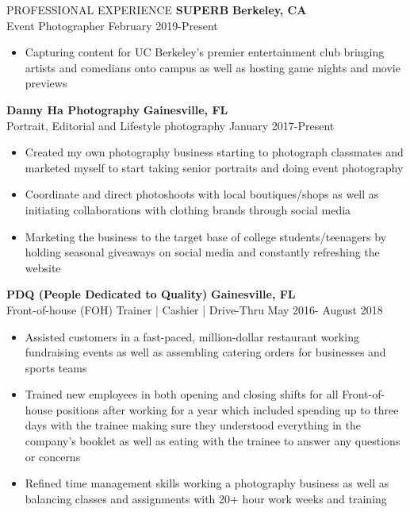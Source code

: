 \documentclass{resume}
\begin{document}
\begin{rSection}{PROFESSIONAL EXPERIENCE}
{\bf SUPERB } \hfill {\bf Berkeley, CA}
\\ {Event Photographer}  \hfill {February 2019-Present}
\begin{itemize}
  \item Capturing content for UC Berkeley’s premier entertainment club bringing artists and comedians onto campus as well as hosting game nights and movie previews
\end{itemize}

{\bf Danny Ha Photography } \hfill {\bf Gainesville, FL}
\\ {Portrait, Editorial and Lifestyle photography  	}  \hfill {January 2017-Present}
\begin{itemize}
  \item Created my own photography business starting to photograph classmates and marketed myself to start taking senior portraits and doing event photography
  \item Coordinate and direct photoshoots with local boutiques/shops as well as initiating collaborations with clothing brands through social media 
  \item Marketing the business to the target base of college students/teenagers by holding seasonal giveaways on social media and constantly refreshing the website
\end{itemize}

{\bf PDQ (People Dedicated to Quality)  } \hfill {\bf Gainesville, FL}
\\ {Front-of-house (FOH) Trainer | Cashier | Drive-Thru	}  \hfill {May 2016- August 2018}
\begin{itemize}
  \item Assisted customers in a fast-paced, million-dollar restaurant working fundraising events as well as assembling catering orders for businesses and sports teams 
  \item Trained new employees in both opening and closing shifts for all Front-of-house positions after working for a year which included spending up to three days with the trainee making sure they understood everything in the company’s booklet as well as eating with the trainee to answer any questions or concerns
  \item Refined time management skills working a photography business as well as balancing classes and assignments with 20+ hour work weeks and training
\end{itemize}

\end{rSection}
\end{document}
